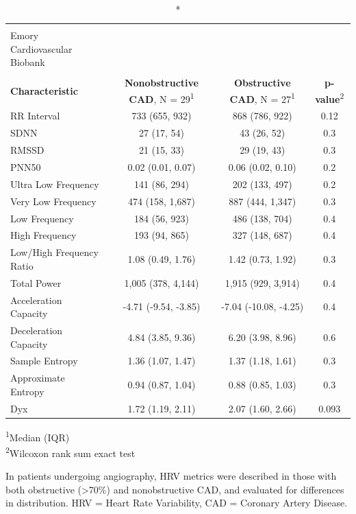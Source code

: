 \documentclass[
  11pt,
  openany]{book}
\begin{document}
\captionsetup[table]{labelformat=empty,skip=1pt}
\begin{longtable}{lccc}
\caption*{
\large HRV and Obstructive CAD\\ 
\small Emory Cardiovascular Biobank\\ 
} \\ 
\toprule
\textbf{Characteristic} & \textbf{Nonobstructive CAD}, N = 29\textsuperscript{1} & \textbf{Obstructive CAD}, N = 27\textsuperscript{1} & \textbf{p-value}\textsuperscript{2} \\ 
\midrule
RR Interval & 733 (655, 932) & 868 (786, 922) & 0.12 \\ 
SDNN & 27 (17, 54) & 43 (26, 52) & 0.3 \\ 
RMSSD & 21 (15, 33) & 29 (19, 43) & 0.3 \\ 
PNN50 & 0.02 (0.01, 0.07) & 0.06 (0.02, 0.10) & 0.2 \\ 
Ultra Low Frequency & 141 (86, 294) & 202 (133, 497) & 0.2 \\ 
Very Low Frequency & 474 (158, 1,687) & 887 (444, 1,347) & 0.3 \\ 
Low Frequency & 184 (56, 923) & 486 (138, 704) & 0.4 \\ 
High Frequency & 193 (94, 865) & 327 (148, 687) & 0.4 \\ 
Low/High Frequency Ratio & 1.08 (0.49, 1.76) & 1.42 (0.73, 1.92) & 0.3 \\ 
Total Power & 1,005 (378, 4,144) & 1,915 (929, 3,914) & 0.4 \\ 
Acceleration Capacity & -4.71 (-9.54, -3.85) & -7.04 (-10.08, -4.25) & 0.4 \\ 
Deceleration Capacity & 4.84 (3.85, 9.36) & 6.20 (3.98, 8.96) & 0.6 \\ 
Sample Entropy & 1.36 (1.07, 1.47) & 1.37 (1.18, 1.61) & 0.3 \\ 
Approximate Entropy & 0.94 (0.87, 1.04) & 0.88 (0.85, 1.03) & 0.3 \\ 
Dyx & 1.72 (1.19, 2.11) & 2.07 (1.60, 2.66) & 0.093 \\ 
\bottomrule
\end{longtable}
\vspace{-5mm}
\begin{minipage}{\linewidth}
\textsuperscript{1}Median (IQR) \\ 
\textsuperscript{2}Wilcoxon rank sum exact test \\ 
\end{minipage}
\begin{minipage}{\linewidth}
In patients undergoing angiography, HRV metrics were described in those with both obstructive (>70\%) and nonobstructive CAD, and evaluated for differences in distribution. HRV = Heart Rate Variability, CAD = Coronary Artery Disease.\\ 
\end{minipage}
\end{document}
